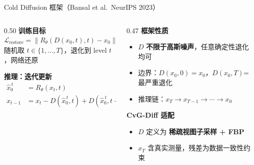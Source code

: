 \documentclass[aspectratio=169,10pt]{beamer}
\begin{document}
\begin{frame}{Cold Diffusion 框架（Bansal et al.~NeurIPS 2023）}
  \vspace{0.3em}
  \begin{columns}[T]
    \begin{column}{0.50\textwidth}
      \textbf{训练目标}
      \[
        \mathcal{L}_{\mathrm{restore}}
        =\bigl\|R_\theta(D(x_0,t),t)-x_0\bigr\|_2^2
      \]
      \vspace{0.3em}
      \footnotesize 随机取 $t\in\{1,\ldots,T\}$，退化到 level $t$，网络还原
      \vspace{0.8em}

      \textbf{推理：迭代更新}
      \begin{align*}
        \hat{x}_0^{\,t} &= R_\theta(x_t,t)\\
        x_{t-1} &= x_t - D(\hat{x}_0^{\,t},t)+D(\hat{x}_0^{\,t},t-1)
      \end{align*}
    \end{column}
    \begin{column}{0.47\textwidth}
      \textbf{框架性质}
      \begin{itemize}
        \item $D$ \textbf{不限于高斯噪声}，任意确定性退化均可
        \item 边界：$D(x_0,0)=x_0$，$D(x_0,T)$=最严重退化
        \item 推理链：$x_T\!\to\!x_{T-1}\!\to\!\cdots\!\to\!x_0$
      \end{itemize}
      \vspace{0.5em}
      \textbf{CvG-Diff 适配}
      \begin{itemize}
        \item $D$ 定义为 \textbf{稀疏视图子采样 + FBP}
        \item $x_T$ 含真实测量，残差为数据一致性约束
      \end{itemize}
    \end{column}
  \end{columns}
\end{frame}
\end{document}
